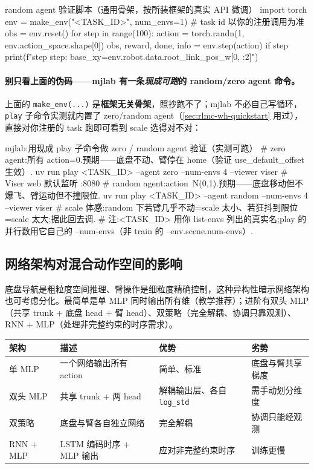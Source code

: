 \begin{codebox}[Python]{random agent 验证脚本（通用骨架，按所装框架的真实 API 微调）}
import torch
env = make_env("<TASK_ID>", num_envs=1)   # task id 以你的注册调用为准
obs = env.reset()
for step in range(100):
    action = torch.randn(1, env.action_space.shape[0])
    obs, reward, done, info = env.step(action)
    if step %
        print(f"step {step}: base_xy={env.robot.data.root_link_pos_w[0, :2]}")
\end{codebox}

\paragraph{别只看上面的伪码——mjlab 有一条\emph{现成可跑}的 random/zero agent 命令。}上面的 \verb|make_env(...)| 是\textbf{框架无关骨架}，照抄跑不了；mjlab 不必自己写循环，\verb|play| 子命令实测就内置了 zero/random agent（\cref{sec:rlmc-wh-quickstart} 用过），直接对你注册的 task 跑即可看到 scale 选得对不对：

\begin{codebox}[bash]{mjlab:用现成 play 子命令做 zero / random agent 验证（实测可跑）}
# zero agent:所有 action=0.预期——底盘不动、臂停在 home（验证 use_default_offset 生效）.
uv run play <TASK_ID> --agent zero   --num-envs 4 --viewer viser   # Viser web 默认监听 :8080
# random agent:action~N(0,1).预期——底盘移动但不爆飞、臂运动但不撞限位.
uv run play <TASK_ID> --agent random --num-envs 4 --viewer viser
# scale 体感:random 下若臂几乎不动=scale 太小、若狂抖到限位=scale 太大;据此回去调.
# 注:<TASK_ID> 用你 list-envs 列出的真实名;play 的并行数用它自己的 --num-envs（非 train 的 --env.scene.num-envs）.
\end{codebox}

\subsection{网络架构对混合动作空间的影响}
\label{sec:rlmc-wh-arch}

底盘导航是粗粒度空间推理、臂操作是细粒度精确控制，这种异构性暗示网络架构也可考虑分化。最简单是单 MLP 同时输出所有维（教学推荐）；进阶有双头 MLP（共享 trunk + 底盘 head + 臂 head）、双策略（完全解耦、协调只靠观测）、RNN + MLP（处理非完整约束的时序需求）。

\begin{center}
\small
\begin{tabular}{@{}llll@{}}
\toprule
架构 & 描述 & 优势 & 劣势 \\
\midrule
单 MLP & 一个网络输出所有 action & 简单、标准 & 底盘与臂共享梯度 \\
双头 MLP & 共享 trunk + 两 head & 解耦输出层、各自 \verb|log_std| & 需手动划分维度 \\
双策略 & 底盘与臂各自独立网络 & 完全解耦 & 协调只能经观测 \\
RNN + MLP & LSTM 编码时序 + MLP 输出 & 应对非完整约束时序 & 训练更慢 \\
\bottomrule
\end{tabular}
\end{center}

